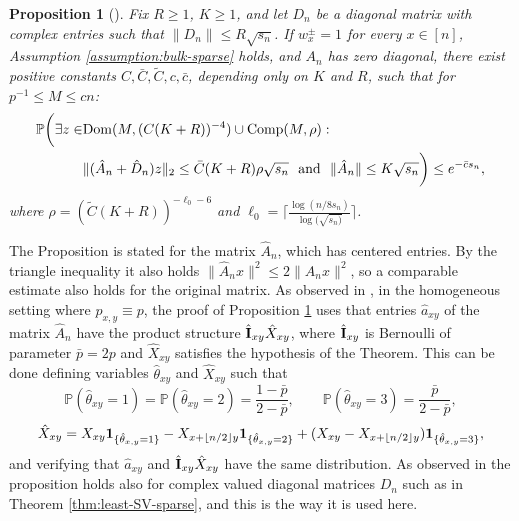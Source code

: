 \documentclass[11pt,oneside]{amsart}
\theoremstyle{plain}
\newtheorem{proposition}[theorem]{Proposition}
\numberwithin{equation}{section}
\newcommand{\p}{\mathbb{P}}
\newcommand{\one}{\textup{\textbf{1}}}
\newcommand{\scaling}{s_n}
\begin{document}
\begin{proposition}[{\cite[Proposition 7.3]{BasakRudelson-invertibility}}] \label{thm:least-SV-prop}
Fix $R \ge 1$, $K\ge 1$, and let $D_n$ be a diagonal matrix with complex entries such that
$\|D_n\| \le R\sqrt{\scaling}$.
If $w_x^\pm = 1$ for every $x \in [n]$, Assumption \ref{assumption:bulk-sparse} holds, and $A_n$ has zero diagonal, there
exist positive constants $C,\bar C,\tilde C,c,\bar c$, 
depending only on $K$ and $R$, 
such that for $p^{-1}\le M\le cn$:
\begin{equation}
\begin{split}
    \p \bigg(\exists z \in &{\rm Dom}(M,(C(K+R))^{-4})\cup {\rm Comp}(M,\rho) :\\
    &\|(\hat A_n +\hat D_n)z\|_2 \le \bar C (K+R)\rho \sqrt{\scaling} \ \text{  and  }\ \|\hat A_n\|\le K\sqrt{\scaling}\bigg) \le e^{-\bar c\scaling},
    \end{split}
\end{equation}
where $\rho = (\tilde C(K+R))^{-\ell_0-6}$ and $\ell_0=\lceil \frac{\log(n/8\scaling)}{\log(\sqrt{\scaling)}} \rceil$.
\end{proposition}

The Proposition is stated for the matrix $\hat A_n$, which has centered entries. By the triangle inequality it also holds $\|\hat A_nx\|^2\le 2\|A_nx\|^2$, so a comparable estimate also holds for the original matrix.
As observed in \cite[pp. 477-478]{BasakRudelson-invertibility}, in the homogeneous setting where $p_{x,y}\equiv p$, the proof of Proposition \ref{thm:least-SV-prop} uses that entries $\hat a_{xy}$ of the matrix $\hat A_n$ have the product structure $\hat{\rm \bf I}_{xy} \hat X_{xy}$, where $\hat{\rm \bf I}_{xy}$ is Bernoulli of parameter $\bar p =2p$ and $\hat X_{xy}$ satisfies the hypothesis of the Theorem. This can be done defining variables $\hat \theta_{xy}$ and $\hat X_{xy}$ such that
    \begin{equation} \label{eq:theta}
        \p(\hat \theta_{xy}=1)=\p(\hat \theta_{xy}=2)=\frac{1-\bar p}{2-\bar p} ,\qquad \p(\hat \theta_{xy}=3)=\frac{\bar p}{2-\bar p},
    \end{equation}
        \begin{equation} \label{eq:X}
        \hat X_{xy} = X_{xy} \one_{\{\hat \theta_{x,y}=1\}}-X_{x+\lfloor {n}/{2}\rfloor y} \one_{\{\hat \theta_{x,y}=2\}}+(X_{xy}-X_{x+\lfloor{n}/{2}\rfloor y}) \one_{\{\hat \theta_{x,y}=3\}},
    \end{equation}
    and verifying that $\hat a_{xy}$ and $\hat{\rm \bf I}_{xy} \hat X_{xy}$ have the same distribution.  As observed in \cite[p.\ 55]{BasakRudelson19-arxiv} the proposition holds also for complex valued diagonal matrices $D_n$ such as in Theorem \ref{thm:least-SV-sparse}, and this is the way it is used here.
\end{document}
